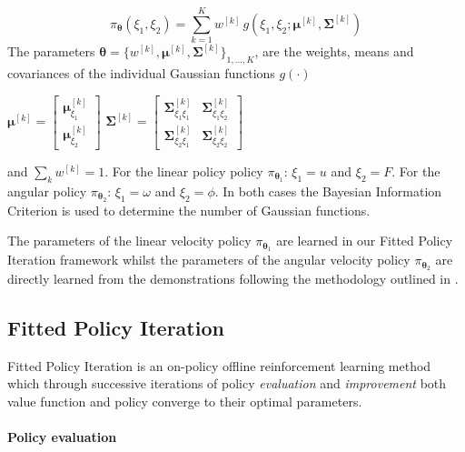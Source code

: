\documentclass[final,5p,times,twocolumn]{elsarticle}
\newcommand{\SigK}{\boldsymbol{\Sigma}^{[k]}}
\newcommand{\MuK}{\boldsymbol{\mu}^{[k]}}
\newcommand{\piK}{w^{[k]}}
\newcommand{\Param}{\boldsymbol{\theta}}
\begin{document}
\begin{equation}
 \pi_{\Param}(\xi_1,\xi_2) = \sum\limits_{k=1}^{K} \piK \, g(\xi_1,\xi_2;\MuK,\SigK) \label{eq:GMM}
\end{equation}
The parameters $\Param = \{w^{[k]},\MuK,\SigK\}_{1,\dots,K}$, are the weights, means and covariances 
of the individual Gaussian functions $g(\cdot)$
\begin{center}
$\MuK =  \begin{bmatrix} \MuK_{\xi_1} \\ \MuK_{\xi_2} \end{bmatrix}$\hspace*{0.5cm}
$\SigK =  \begin{bmatrix} 
	  \SigK_{\xi_1\xi_1} & \SigK_{\xi_1\xi_2} \\
	  \SigK_{\xi_2\xi_1} & \SigK_{\xi_2\xi_2}
	  \end{bmatrix}$
\end{center}
and $\sum_{k} w^{[k]} = 1$. For the linear policy policy $\pi_{\Param_1}$: ${\xi_1 = u}$ and ${\xi_2 = F}$.
For the angular policy $\pi_{\Param_2}$: ${\xi_1 = \omega}$ and ${\xi_2 = \phi}$. In both cases the Bayesian Information Criterion is used to 
determine the number of Gaussian functions.

The parameters of the linear velocity policy $\pi_{\Param_1}$ are learned in our Fitted Policy Iteration framework
whilst the parameters of the angular velocity policy $\pi_{\Param_2}$ are directly learned from the demonstrations following 
the methodology outlined in \cite[Chap. 5]{Kronander2015}. 

\subsection{Fitted Policy Iteration}\label{sec:FPI}

Fitted Policy Iteration is an on-policy offline reinforcement learning method which through successive iterations of policy \textit{evaluation} 
and \textit{improvement} both value function and policy converge to their optimal parameters.

\paragraph{Policy evaluation}
\end{document}
